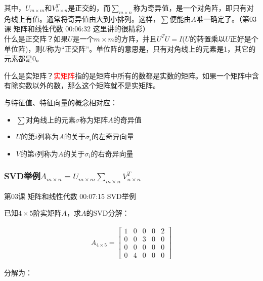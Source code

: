 \documentclass[UTF8]{ctexbook}
\begin{document}
其中，$U_{m \times m}$和$V_{n \times n}^{T}$是正交的，而$\sum _{m \times n}$称为奇异值，是一个对角阵，即只有对角线上有值。通常将奇异值由大到小排列。这样，$\sum$便能由$A$唯一确定了。（第03课 矩阵和线性代数 00:06:32 这里讲的很精彩）\\

什么是正交阵？如果$U$是一个$m \times m$的方阵，并且$U^{T}U=I$($U$的转置乘以$U$正好是个单位阵)，则$U$称为“正交阵”。单位阵的意思是，只有对角线上的元素是1，其它的元素都是0。

什么是实矩阵？\textcolor{red}{实矩阵}指的是矩阵中所有的数都是实数的矩阵。如果一个矩阵中含有除实数以外的数，那么这个矩阵就不是实矩阵。

与特征值、特征向量的概念相对应：

\begin{itemize}
\item $\sum$对角线上的元素$\sigma$称为矩阵$A$的奇异值
\item $U$的第$i$列称为$A$的关于$\sigma_{i}$的左奇异向量
\item $V$的第$i$列称为$A$的关于$\sigma_{i}$的右奇异向量
\end{itemize}

\subsubsection{SVD举例$A_{m \times n} = U_{m \times m} \sum _{m \times n} V_{n \times n}^{T}$}

第03课 矩阵和线性代数 00:07:15 SVD举例

已知$4 \times 5$阶实矩阵$A$，求$A$的SVD分解：

\begin{equation}
\begin{aligned}
A_{4 \times 5}=
\begin{bmatrix}
1 & 0 & 0 & 0 & 2 \\
0 & 0 & 3 & 0 & 0 \\
0 & 0 & 0 & 0 & 0 \\
0 & 4 & 0 & 0 & 0
\end{bmatrix}
\end{aligned}
\end{equation}

分解为：
\end{document}
